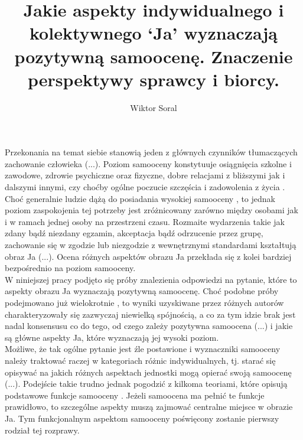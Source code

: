 \documentclass[man]{apa6}
\title{Jakie aspekty indywidualnego i kolektywnego `Ja' wyznaczają
       pozytywną samoocenę. Znaczenie perspektywy sprawcy i biorcy.}
\author{Wiktor Soral}
\affiliation{Uniwersytet Warszawski}
\begin{document}
\maketitle

Przekonania na temat siebie stanowią jeden z głównych czynników tłumaczących zachowanie człowieka (...). Poziom samooceny konstytuuje osiągnięcia szkolne i zawodowe, zdrowie psychiczne oraz fizyczne, dobre relacjami z bliższymi jak i dalszymi innymi, czy choćby ogólne poczucie szczęścia i zadowolenia z życia \parencite{baumeister2003does}. Choć generalnie ludzie dążą do posiadania wysokiej samooceny \parencite{tesser1988toward}, to jednak poziom zaspokojenia tej potrzeby jest zróżnicowany zarówno między osobami jak i w ramach jednej osoby na przestrzeni czasu. Rozmaite wydarzenia takie jak zdany bądź niezdany egzamin, akceptacja bądź odrzucenie przez grupę, zachowanie się w zgodzie lub niezgodzie z wewnętrznymi standardami kształtują obraz Ja (...). Ocena różnych aspektów obrazu Ja przekłada się z kolei bardziej bezpośrednio na poziom samooceny. \\

W niniejszej pracy podjęto się próby znalezienia odpowiedzi na pytanie, które to aspekty obrazu Ja wyznaczają pozytywną samoocenę. Choć podobne próby podejmowano już wielokrotnie \parencite[np., ][]{gebauer2013agency}, to wyniki uzyskiwane przez różnych autorów charakteryzowały się zazwyczaj niewielką spójnością, a co za tym idzie brak jest nadal konsensusu co do tego, od czego zależy pozytywna samoocena (...) i jakie są główne aspekty Ja, które wyznaczają jej wysoki poziom. \\

Możliwe, że tak ogólne pytanie jest źle postawione i wyznaczniki samooceny należy traktować raczej w kategoriach różnic indywidualnych, tj. starać się opisywać na jakich różnych aspektach jednostki mogą opierać swoją samoocenę (...). Podejście takie trudno jednak pogodzić z kilkoma teoriami, które opisują podstawowe funkcje samooceny \parencite[np., ][]{leary1995self, pyszczynski2004people}. Jeżeli samoocena ma pełnić te funkcje prawidłowo, to szczególne aspekty muszą zajmować centralne miejsce w obrazie Ja. Tym funkcjonalnym aspektom samooceny poświęcony zostanie pierwszy rodział tej rozprawy.\\
\end{document}
